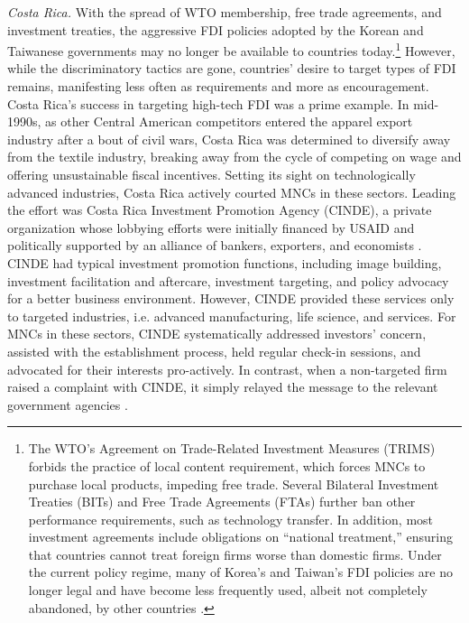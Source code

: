 \textit{Costa Rica.} With the spread of WTO membership, free trade agreements,
and investment treaties, the aggressive FDI policies adopted by the Korean and
Taiwanese governments may no longer be available to countries
today.\footnote{The WTO's Agreement on Trade-Related Investment Measures (TRIMS)
  forbids the practice of local content requirement, which forces MNCs to
  purchase local products, impeding free trade. Several Bilateral Investment
  Treaties (BITs) and Free Trade Agreements (FTAs) further ban other performance
  requirements, such as technology transfer. In addition, most investment
  agreements include obligations on ``national treatment,'' ensuring that
  countries cannot treat foreign firms worse than domestic firms. Under the
  current policy regime, many of Korea's and Taiwan's FDI policies are no longer
  legal and have become less frequently used, albeit not completely abandoned,
  by other countries \citep{Cosbey2015}.} However, while the discriminatory
tactics are gone, countries' desire to target types of FDI remains, manifesting
less often as requirements and more as encouragement. Costa Rica's success in
targeting high-tech FDI was a prime example. In mid-1990s, as other Central
American competitors entered the apparel export industry after a bout of civil
wars, Costa Rica was determined to diversify away from the textile industry,
breaking away from the cycle of competing on wage and offering unsustainable
fiscal incentives. Setting its sight on technologically advanced industries,
Costa Rica actively courted MNCs in these sectors. Leading the effort was Costa
Rica Investment Promotion Agency (CINDE), a private organization whose lobbying
efforts were initially financed by USAID and politically supported by an
alliance of bankers, exporters, and economists \citep{Clark1995}. CINDE had
typical investment promotion functions, including image building, investment
facilitation and aftercare, investment targeting, and policy advocacy for a
better business environment. However, CINDE provided these services only to
targeted industries, i.e. advanced manufacturing, life science, and services.
For MNCs in these sectors, CINDE systematically addressed investors' concern,
assisted with the establishment process, held regular check-in sessions, and
advocated for their interests pro-actively. In contrast, when a non-targeted
firm raised a complaint with CINDE, it simply relayed the message to the
relevant government agencies \citep{OECD2013}.

